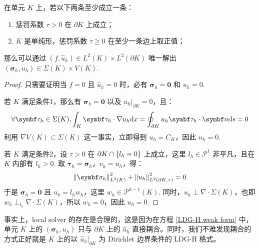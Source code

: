 \begin{theorem} %
	在单元 \(K\) 上，若以下两条至少成立一条：
	\begin{enumerate}
		\item 惩罚系数 \(\tau > 0\) 在 \(\partial K\) 上成立；
		\item \(K\) 是单纯形，惩罚系数 \(\tau \geqslant 0\) 在至少一条边上取正值；
	\end{enumerate}
	那么可以通过 \(\left(f, \widehat{u}_{h}\right) \in L^2(K) \times L^2(\partial K)\) 唯一解出 \(\left(\bm\sigma_{h}, u_{h}\right) \in \Sigma(K) \times V(K)\).
	\begin{proof}
		只需要证明当 \(f = 0\) 且 \(\widehat{u}_{h} = 0\) 时，必有 \(\bm\sigma_{h} = \bm 0\) 和 \(u_{h} = 0\). 

		若 \(K\) 满足条件1，那么有 \(\bm\sigma_{h} = \bm 0\) 以及 \(u_{h}\big|_{\partial K} = 0\)，且：
		\begin{equation*}
			\forall \bm\tau_{h} \in \Sigma(K), 
			\int_{K} \bm\tau_{h} \cdot \nabla u_{h} \d x
			= \oint_{\partial K} u_{h} \bm\tau_{h} \cdot \bm n \d s
			= 0
		\end{equation*}
		利用 \(\nabla V(K) \subset \Sigma(K)\) 这一事实，立即得到 \(u_{h} = C_{K}\)，因此 \(u_{h} = 0\).
		
		若 \(K\) 满足条件2，设 \(\tau > 0\) 在 \(\partial K \cap \left\{l_{h} = 0\right\}\) 上成立，这里 \(l_{h} \in \mathscr{P}^{1}\) 非平凡，且在 \(K\) 内部有 \(l_{h} > 0\). 取 \(\bm\tau_{h} = \bm\sigma_{h}\)，\(v_{h} = u_{h}\)，得：
		\begin{equation}
			\norm{\bm\sigma_{h}}_{L^2(K)}^2 + \norm{u_{h}}_{L^2(\partial K, \tau)}^2 = 0
		\end{equation}
		于是 \(\bm\sigma_{h} = \bm 0\) 且 \(u_{h} = l_{h} w_{h}\)，这里 \(w_{h} \in \mathscr{P}^{k-1}(K)\). 同时，\(u_{h} \perp \nabla\cdot\Sigma(K)\)，也即 \(w_{h} \perp_{l_{h}} \nabla \cdot \Sigma(K)\)，所以 \(w_{h} = 0\)，因此 \(u_{h} = 0\).
	\end{proof}
\end{theorem}

\begin{remark}
	事实上，local solver 的存在是合理的，这是因为在方程 \eqref{LDG-H weak form} 中，单元 \(K\) 上的 \(\left(\bm\sigma_{h}, u_{h}\right)\) 只与 \(\partial K\) 上的 \(\widehat{u}_{h}\) 直接耦合。同时，我们不难发现耦合的方式正好就是 \(K\) 上的以 \(\widehat{u}_{h}\big|_{\partial K}\) 为 Dirichlet 边界条件的 LDG-H 格式。
\end{remark}

